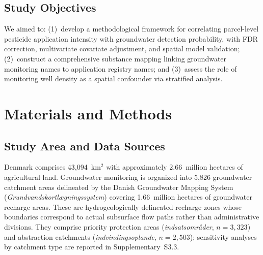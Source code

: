 \documentclass[12pt,a4paper]{article}
\begin{document}
\subsection{Study Objectives}

We aimed to: (1)~develop a methodological framework for correlating parcel-level pesticide application intensity with groundwater detection probability, with FDR correction, multivariate covariate adjustment, and spatial model validation; (2)~construct a comprehensive substance mapping linking groundwater monitoring names to application registry names; and (3)~assess the role of monitoring well density as a spatial confounder via stratified analysis.

\section{Materials and Methods}

\subsection{Study Area and Data Sources}

Denmark comprises 43,094~km$^2$ with approximately 2.66~million hectares of agricultural land. Groundwater monitoring is organized into 5,826 groundwater catchment areas delineated by the Danish Groundwater Mapping System (\textit{Grundvandskortl\ae gningssystem}) covering 1.66~million hectares of groundwater recharge areas. These are hydrogeologically delineated recharge zones whose boundaries correspond to actual subsurface flow paths rather than administrative divisions. They comprise priority protection areas (\textit{indsatsomr\aa der}, $n = 3{,}323$) and abstraction catchments (\textit{indvindingsoplande}, $n = 2{,}503$); sensitivity analyses by catchment type are reported in Supplementary~S3.3.
\end{document}
